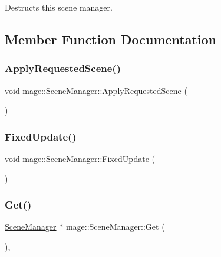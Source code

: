 Destructs this scene manager. 

\subsection{Member Function Documentation}
\hypertarget{classmage_1_1_scene_manager_adadc65dc4bd9643c1befd261903309f7}{}\label{classmage_1_1_scene_manager_adadc65dc4bd9643c1befd261903309f7} 
\subsubsection{\texorpdfstring{Apply\+Requested\+Scene()}{ApplyRequestedScene()}}
{\footnotesize\ttfamily void mage\+::\+Scene\+Manager\+::\+Apply\+Requested\+Scene (\begin{DoxyParamCaption}{ }\end{DoxyParamCaption})\hspace{0.3cm}{\ttfamily [private]}}

\hypertarget{classmage_1_1_scene_manager_a6d97c0fb7945aeb53ec950e62567c1f4}{}\label{classmage_1_1_scene_manager_a6d97c0fb7945aeb53ec950e62567c1f4} 
\subsubsection{\texorpdfstring{Fixed\+Update()}{FixedUpdate()}}
{\footnotesize\ttfamily void mage\+::\+Scene\+Manager\+::\+Fixed\+Update (\begin{DoxyParamCaption}{ }\end{DoxyParamCaption})}

\hypertarget{classmage_1_1_scene_manager_a282dbbea100d7de48c0b0876619db5e7}{}\label{classmage_1_1_scene_manager_a282dbbea100d7de48c0b0876619db5e7} 
\subsubsection{\texorpdfstring{Get()}{Get()}}
{\footnotesize\ttfamily \hyperlink{classmage_1_1_scene_manager}{Scene\+Manager} $\ast$ mage\+::\+Scene\+Manager\+::\+Get (\begin{DoxyParamCaption}{ }\end{DoxyParamCaption})\hspace{0.3cm}{\ttfamily [static]}, {\ttfamily [noexcept]}}

